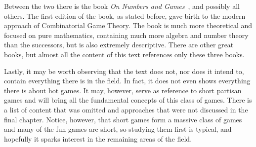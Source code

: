 Between the two there is the book \textit{On Numbers and Games}~\cite{ONAG1,ONAG2}, and possibly all others. The first edition of the book, as stated before, gave birth to the modern approach of Combinatorial Game Theory. The book is much more theoretical and focused on pure mathematics, containing much more algebra and number theory than the successors, but is also extremely descriptive. There are other great books, but almost all the content of this text references only these three books.

Lastly, it may be worth observing that the text does not, nor does it intend to, contain everything there is in the field. In fact, it does not even shows everything there is about hot games. It may, however, serve as reference to short partisan games and will bring all the fundamental concepts of this class of games. There is a list of content that was omitted and approaches that were not discussed in the final chapter. Notice, however, that short games form a massive class of games and many of the fun games are short, so studying them first is typical, and hopefully it sparks interest in the remaining areas of the field.













